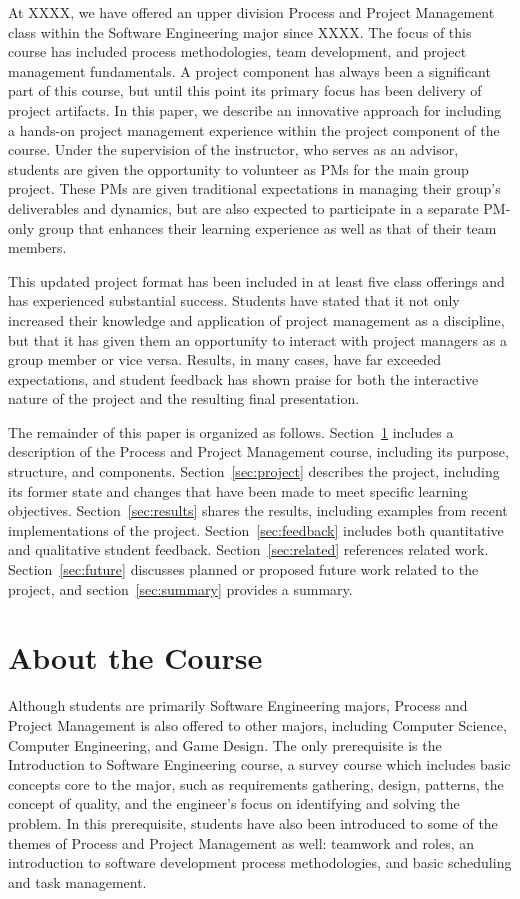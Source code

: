 \documentclass{sig-alternate}
\newif\ifisnopii
\begin{document}
At \ifisnopii the Rochester Institute of Technology (RIT)\else XXXX\fi, we have offered an upper division Process and
Project Management class within the Software Engineering major since \ifisnopii 1998\else XXXX\fi. The focus of this course
has included process methodologies, team development, and project management fundamentals. A
project component has always been a significant part of this course, but until this point its primary focus
has been delivery of project artifacts. In this paper, we describe an innovative approach for including a
hands-on project management experience within the project component of the course. Under the
supervision of the instructor, who serves as an advisor, students are given the opportunity to volunteer as
PMs for the main group project. These PMs are given traditional expectations in
managing their group's deliverables and dynamics, but are also expected to participate in a separate PM-only
group that enhances their learning experience as well as that of their team members.

This updated project format has been included in at least five class offerings and has experienced
substantial success. Students have stated that it not only increased their knowledge and application of
project management as a discipline, but that it has given them an opportunity to interact with project managers
as a group member or vice versa. Results, in many cases, have far exceeded expectations, and student
feedback has shown praise for both the interactive nature of the project and the resulting final
presentation.

The remainder of this paper is organized as follows. Section~\ref{sec:course} includes a description of the Process
and Project Management course, including its purpose, structure, and components. Section~\ref{sec:project} describes
the project, including its former state and changes that have been made to meet specific learning
objectives. Section~\ref{sec:results} shares the results, including examples from recent implementations of the project.
 Section~\ref{sec:feedback} includes both quantitative and qualitative student feedback. Section~\ref{sec:related} references
related work. Section~\ref{sec:future} discusses planned or proposed future work related to the project, and section~\ref{sec:summary}
provides a summary.

\section{About the Course}
\label{sec:course}
Although students are primarily Software Engineering majors, Process and Project Management is
also offered to other majors, including Computer Science, Computer Engineering, and Game Design. The
only prerequisite is the Introduction to Software Engineering course, a survey course which includes basic
concepts core to the major, such as requirements gathering, design, patterns, the concept of quality, and 
the engineer's focus on identifying and solving the problem. In this prerequisite, students have also been introduced to some of the themes of
Process and Project Management as well: teamwork and roles, an introduction to software development
process methodologies, and basic scheduling and task management.
\end{document}
